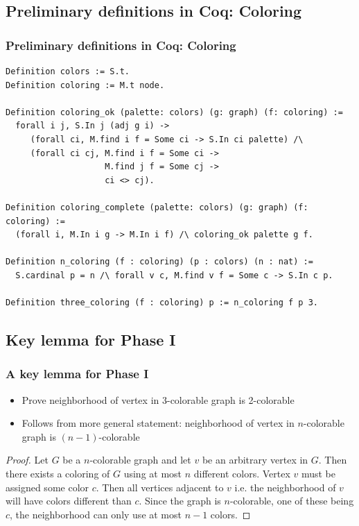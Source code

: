 \documentclass{beamer}
\begin{document}
\subsection{Preliminary definitions in Coq: Coloring}
\begin{frame}[fragile]
\frametitle{Preliminary definitions in Coq: Coloring}
\begin{verbatim}
Definition colors := S.t.
Definition coloring := M.t node.

Definition coloring_ok (palette: colors) (g: graph) (f: coloring) :=
  forall i j, S.In j (adj g i) ->
     (forall ci, M.find i f = Some ci -> S.In ci palette) /\
     (forall ci cj, M.find i f = Some ci ->
                    M.find j f = Some cj ->
                    ci <> cj).

Definition coloring_complete (palette: colors) (g: graph) (f: coloring) :=
  (forall i, M.In i g -> M.In i f) /\ coloring_ok palette g f.

Definition n_coloring (f : coloring) (p : colors) (n : nat) :=
  S.cardinal p = n /\ forall v c, M.find v f = Some c -> S.In c p.

Definition three_coloring (f : coloring) p := n_coloring f p 3.
\end{verbatim}
\end{frame}

\subsection{Key lemma for Phase I}
\begin{frame}
\frametitle{A key lemma for Phase I}
\begin{itemize}
\item Prove neighborhood of vertex in 3-colorable graph is 2-colorable
\item Follows from more general statement: neighborhood of vertex in
  $n$-colorable graph is $(n-1)$-colorable
\end{itemize}
\begin{proof}
Let $G$ be a $n$-colorable graph and let $v$ be an arbitrary vertex in $G$. Then there exists a coloring of $G$ using at most $n$ different colors. Vertex $v$ must be assigned some color $c$. Then all vertices adjacent to $v$ i.e. the neighborhood of $v$ will have colors different than $c$. Since the graph is $n$-colorable, one of these being $c$, the neighborhood can only use at most $n-1$ colors.
\end{proof}
\end{frame}
\end{document}
